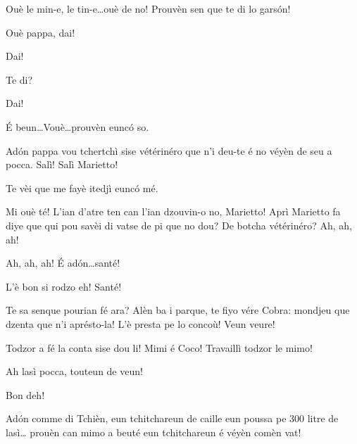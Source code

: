 \begin{drama}
\Mariettospeaks  Ouè le min-e, le tin-e\ldots ouè de no! Prouvèn sen que te di lo gars\'on!

\Simonspeaks Ouè pappa, dai!

\Mariettospeaks {} Dai!

\Cienspeaks Te di?

\Mariettospeaks {} Dai!

\Cienspeaks \'E beun\ldots Vouè\ldots prouvèn eunc\'o so.

\Simonspeaks Ad\'on pappa vou tchertchì sise vétérinéro que n’i deu-te é no véyèn de seu a pocca. Salì! Salì Marietto!


\Mariettospeaks Te vèi que me fayè itedjì eunc\'o mé.

\Cienspeaks Mi ouè té! L’ian d’atre ten can l'ian dzouvin-o no, Marietto! Aprì Marietto fa diye que qui pou savèi di vatse de pi que no dou? De botcha vétérinéro? Ah, ah, ah!

\Mariettospeaks Ah, ah, ah! \'E ad\'on\ldots santé! 


\Cienspeaks L'è bon si rodzo eh! Santé!


\Cienspeaks Te sa senque pourian fé ara? Alèn ba i parque, te fiyo vére Cobra: mondjeu que dzenta que n'i aprésto-la! L'è presta pe lo concoù! Veun veure!


\Sahlammspeaks {} Todzor a fé la conta sise dou li! Mimi é Coco! Travaillì todzor le mimo!


\Sahlammspeaks Ah lasì pocca, touteun de veun!


\Sahlammspeaks Bon deh!


\Sahlammspeaks Ad\'on comme di Tchièn, eun tchitchareun de caille eun poussa pe 300 litre de lasì\ldots {} prouèn can mimo a beuté eun tchitchareun é véyèn comèn vat!


\end{drama}

